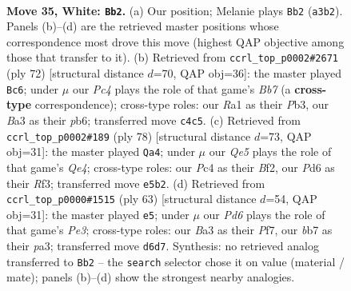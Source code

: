 \documentclass[11pt]{article}
\begin{document}
\clearpage

\begin{figure}[p]\centering
\begin{subfigure}{0.46\textwidth}\centering
\resizebox{\linewidth}{!}{%
\newchessgame
\chessboard[
  setfen={1n1q4/1b3p1k/1p1P1n2/4Q2p/p1P3pP/B5P1/P4P2/R5K1 w - - 1 35},
  showmover=false,
  pgfstyle=straightmove, color=movearrow, markmove={a3-b2}
]}
\caption{}
\end{subfigure}\hfill
\begin{subfigure}{0.46\textwidth}\centering
\resizebox{\linewidth}{!}{%
\newchessgame
\chessboard[
  setfen={3q2k1/pB3p2/1p2pn1p/1P2Q1p1/P7/1P4PP/5PK1/8 w - - 0 37},
  showmover=false,
  pgfstyle=straightmove, color=movearrow, markmove={b7-c6}
]}
\caption{}
\end{subfigure}
\\[4pt]
\begin{subfigure}{0.46\textwidth}\centering
\resizebox{\linewidth}{!}{%
\newchessgame
\chessboard[
  setfen={4r1k1/pp1q1pp1/8/2Pn2Pp/4Q2P/1P1P1R2/P4BK1/8 w - - 5 40},
  showmover=false,
  pgfstyle=straightmove, color=movearrow, markmove={e4-a4}
]}
\caption{}
\end{subfigure}\hfill
\begin{subfigure}{0.46\textwidth}\centering
\resizebox{\linewidth}{!}{%
\newchessgame
\chessboard[
  setfen={4r1k1/5pp1/4p2p/p1p5/2P1Q3/P5BP/1P1qN1P1/6K1 b - - 0 32},
  showmover=false,
  pgfstyle=straightmove, color=movearrow, markmove={e6-e5}
]}
\caption{}
\end{subfigure}
\caption{\textbf{Move 35, White: \texttt{Bb2}.} (a) Our position; Melanie plays \texttt{Bb2} (\texttt{a3b2}). Panels (b)--(d) are the retrieved master positions whose correspondence most drove this move (highest QAP objective among those that transfer to it). (b) Retrieved from \texttt{ccrl\_top\_p0002\#2671} (ply 72) [structural distance $d$=70, QAP obj=36]: the master played \texttt{Bc6}; under $\mu$ our \emph{Pc4} plays the role of that game's \emph{Bb7} (a \textbf{cross-type} correspondence); cross-type roles: our \emph{R}a1 as their \emph{P}b3, our \emph{B}a3 as their \emph{p}b6; transferred move \texttt{c4c5}. (c) Retrieved from \texttt{ccrl\_top\_p0002\#189} (ply 78) [structural distance $d$=73, QAP obj=31]: the master played \texttt{Qa4}; under $\mu$ our \emph{Qe5} plays the role of that game's \emph{Qe4}; cross-type roles: our \emph{P}c4 as their \emph{B}f2, our \emph{P}d6 as their \emph{R}f3; transferred move \texttt{e5b2}. (d) Retrieved from \texttt{ccrl\_top\_p0000\#1515} (ply 63) [structural distance $d$=54, QAP obj=31]: the master played \texttt{e5}; under $\mu$ our \emph{Pd6} plays the role of that game's \emph{Pe3}; cross-type roles: our \emph{B}a3 as their \emph{P}f7, our \emph{b}b7 as their \emph{p}a3; transferred move \texttt{d6d7}. Synthesis: no retrieved analog transferred to \texttt{Bb2} -- the \texttt{search} selector chose it on value (material / mate); panels (b)--(d) show the strongest nearby analogies.}
\label{fig:thought-m68}
\end{figure}
\end{document}
